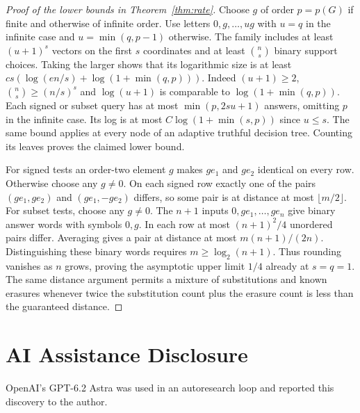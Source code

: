 \documentclass[11pt,letterpaper]{article}
\numberwithin{equation}{section}
\begin{document}
\begin{proof}[Proof of the lower bounds in Theorem~\ref{thm:rate}]

Choose $g$ of order $p=p(G)$ if finite and otherwise of infinite order. Use letters
$0,g,\ldots,ug$ with $u=q$ in the infinite case and $u=\min(q,p-1)$ otherwise. The family
includes at least $(u+1)^s$ vectors on the first $s$ coordinates and at least $\binom ns$
binary support choices. Taking the larger shows that its logarithmic size is at least $c
s(\log(en/s)+\log(1+\min(q,p)))$. Indeed $(u+1)\ge2$, $\binom ns\ge(n/s)^s$ and $\log(u+1)$ is
comparable to $\log(1+\min(q,p))$. Each signed or subset query has at most $\min(p,2su+1)$
answers, omitting $p$ in the infinite case. Its log is at most $C\log(1+\min(s,p))$ since
$u\le s$. The same bound applies at every node of an adaptive truthful decision tree. Counting
its leaves proves the claimed lower bound.

For signed tests an order-two element $g$ makes $ge_1$ and $ge_2$ identical on every row.
Otherwise choose any $g\ne0$. On each signed row exactly one of the pairs $(ge_1,ge_2)$ and
$(ge_1,-ge_2)$ differs, so some pair is at distance at most $\lfloor m/2\rfloor$. For subset
tests, choose any $g\ne0$. The $n+1$ inputs $0,ge_1,\ldots,ge_n$ give binary answer words with
symbols $0,g$. In each row at most $(n+1)^2/4$ unordered pairs differ. Averaging gives a pair
at distance at most $m(n+1)/(2n)$. Distinguishing these binary words requires
$m\ge\log_2(n+1)$. Thus rounding vanishes as $n$ grows, proving the asymptotic upper limit
$1/4$ already at $s=q=1$. The same distance argument permits a mixture of substitutions and
known erasures whenever twice the substitution count plus the erasure count is less than the
guaranteed distance.
\end{proof}

\section*{AI Assistance Disclosure}

OpenAI's GPT-6.2 Astra was used in an autoresearch loop and reported this discovery to the author.
\end{document}
